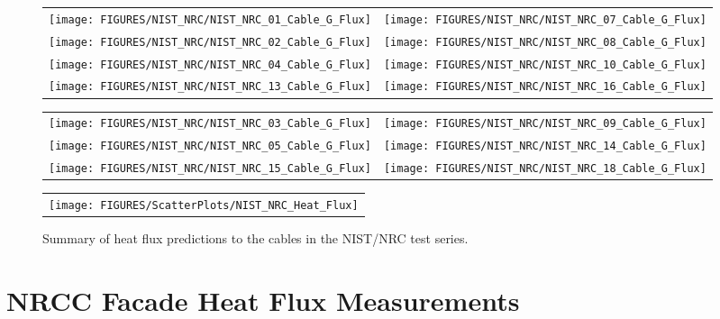 \begin{figure}[p]
\begin{tabular*}{\textwidth}{l@{\extracolsep{\fill}}r}
\texttt{[image: FIGURES/NIST\_NRC/NIST\_NRC\_01\_Cable\_G\_Flux]} &
\texttt{[image: FIGURES/NIST\_NRC/NIST\_NRC\_07\_Cable\_G\_Flux]} \\
\texttt{[image: FIGURES/NIST\_NRC/NIST\_NRC\_02\_Cable\_G\_Flux]} &
\texttt{[image: FIGURES/NIST\_NRC/NIST\_NRC\_08\_Cable\_G\_Flux]} \\
\texttt{[image: FIGURES/NIST\_NRC/NIST\_NRC\_04\_Cable\_G\_Flux]} &
\texttt{[image: FIGURES/NIST\_NRC/NIST\_NRC\_10\_Cable\_G\_Flux]} \\
\texttt{[image: FIGURES/NIST\_NRC/NIST\_NRC\_13\_Cable\_G\_Flux]} &
\texttt{[image: FIGURES/NIST\_NRC/NIST\_NRC\_16\_Cable\_G\_Flux]}
\end{tabular*}
\label{NIST_NRC_Cable_G_Flux_Closed}
\end{figure}

\begin{figure}[p]
\begin{tabular*}{\textwidth}{l@{\extracolsep{\fill}}r}
\texttt{[image: FIGURES/NIST\_NRC/NIST\_NRC\_03\_Cable\_G\_Flux]} &
\texttt{[image: FIGURES/NIST\_NRC/NIST\_NRC\_09\_Cable\_G\_Flux]} \\
\texttt{[image: FIGURES/NIST\_NRC/NIST\_NRC\_05\_Cable\_G\_Flux]} &
\texttt{[image: FIGURES/NIST\_NRC/NIST\_NRC\_14\_Cable\_G\_Flux]} \\
\texttt{[image: FIGURES/NIST\_NRC/NIST\_NRC\_15\_Cable\_G\_Flux]} &
\texttt{[image: FIGURES/NIST\_NRC/NIST\_NRC\_18\_Cable\_G\_Flux]}
\end{tabular*}
\label{NIST_NRC_Cable_G_Flux_Open}
\end{figure}



\begin{figure}[p]
\begin{center}
\begin{tabular}{c}
\texttt{[image: FIGURES/ScatterPlots/NIST\_NRC\_Heat\_Flux]}
\end{tabular}
\end{center}
\caption[Summary of heat flux predictions to cables, NIST/NRC test series.]
{Summary of heat flux predictions to the cables in the NIST/NRC test series.}
\end{figure}

\clearpage

\section{NRCC Facade Heat Flux Measurements}


